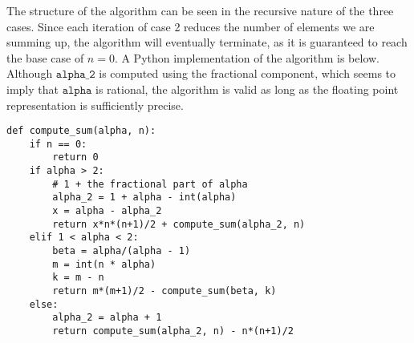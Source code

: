 \documentclass[oneside, 12pt]{article}
\begin{document}
The structure of the algorithm can be seen in the recursive nature of the three cases. Since each iteration of case 2 reduces the number of elements we are summing up, the algorithm will eventually terminate, as it is guaranteed to reach the base case of $n = 0$. A Python implementation of the algorithm is below. Although $\texttt{alpha\_2}$ is computed using the fractional component, which seems to imply that $\texttt{alpha}$ is rational, the algorithm is valid as long as the floating point representation is sufficiently precise. 
\begin{lstlisting}
def compute_sum(alpha, n):
	if n == 0:
		return 0
	if alpha > 2:
		# 1 + the fractional part of alpha
		alpha_2 = 1 + alpha - int(alpha)
		x = alpha - alpha_2
		return x*n*(n+1)/2 + compute_sum(alpha_2, n)
	elif 1 < alpha < 2:
		beta = alpha/(alpha - 1)
		m = int(n * alpha)
		k = m - n
		return m*(m+1)/2 - compute_sum(beta, k)
	else:
		alpha_2 = alpha + 1
		return compute_sum(alpha_2, n) - n*(n+1)/2
\end{lstlisting}
\end{document}

